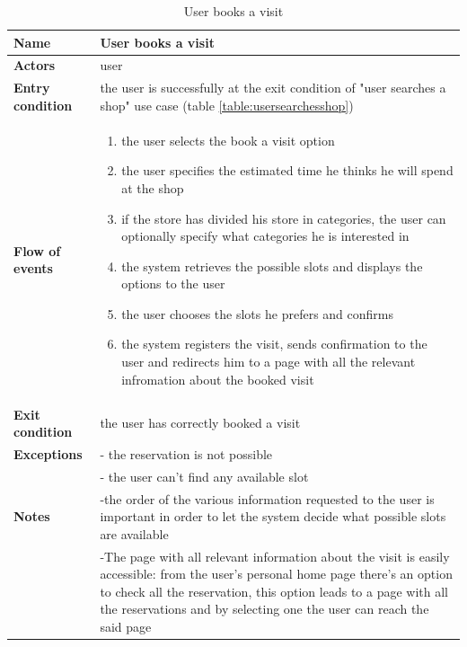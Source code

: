\begin{table}[h!]
    \centering
    \begin{tabular}{@{}P{0.2\textwidth}P{0.70\textwidth}@{}}
        \toprule
        \textbf{Name}                 & User books a visit\\
        \midrule
        \textbf{Actors}               & user\\
        \textbf{Entry condition}      & the user is successfully at the exit condition of "user searches a shop" use case (table \ref{table:usersearchesshop})\\
        \textbf{Flow of events}       & 
        \begin{enumerate}[nolistsep, leftmargin=*]
            \item the user selects the book a visit option
            \item the user specifies the estimated time he thinks he will spend at the shop
            \item if the store has divided his store in categories, the user can optionally specify what categories he is interested in
            \item the system retrieves the possible slots and displays the options to the user
            \item the user chooses the slots he prefers and confirms
            \item the system registers the visit, sends confirmation to the user and redirects him to a page with all the relevant infromation about the booked visit
        \end{enumerate} \\
        \textbf{Exit condition}       & the user has correctly booked a visit\\
        \textbf{Exceptions}           
        & - the reservation is not possible\\
        & - the user can't find any available slot\\
        \textbf{Notes} 
        & -the order of the various information requested to the user is important in order to let the system decide what possible slots are available\\
        & -The page with all relevant information about the visit is easily accessible: from the user's personal home page there's an option to check all the reservation, this option leads to a page with all the reservations and by selecting one the user can reach the said page\\
        \bottomrule
    \end{tabular}
\caption{User books a visit}
\label{table:userbooksavisit}
\end{table}

